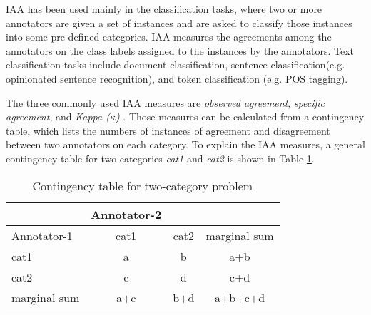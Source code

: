 
%




%


%
%
%
%



IAA has been used mainly in the classification tasks, where two or more annotators 
are given a set of instances and are asked to classify those instances into some 
pre-defined categories. IAA measures the agreements among the annotators on the
class labels assigned to the instances by the annotators. Text classification 
tasks include document classification, sentence classification(e.g. opinionated 
sentence recognition), and token classification (e.g. POS tagging).

The three commonly used IAA measures are {\em observed agreement}, {\em specific agreement}, 
and {\em Kappa ($\kappa$)} \cite{Hripcsak02}. Those measures can be 
calculated from a contingency table, which lists the numbers of instances of 
agreement and disagreement between two annotators on each category. To explain the 
IAA measures, a general contingency table for two categories {\em cat1} and {\em cat2}
 is shown in Table \ref{table:iaa-kappa:contingency}.

\begin{table}[hbt]
\caption{Contingency table for two-category problem}
\label{table:iaa-kappa:contingency}
{\centering
\begin{tabular}{l|cc|c} 
\hline
   & Annotator-2 & & \\
\hline
Annotator-1  & cat1 & cat2 & marginal sum\\
\hline
 cat1& a & b & a+b\\ 
cat2 & c & d & c+d\\
\hline
marginal sum & a+c & b+d &a+b+c+d\\
 \hline
\end{tabular}\par}
\end{table}



